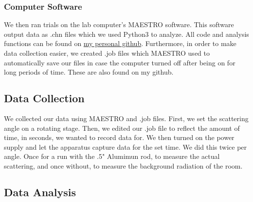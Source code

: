 \documentclass[10pt,letterpaper,onecolumn]{article}
\begin{document}
\subsubsection*{Computer Software}
We then ran trials on the lab computer's MAESTRO software. This software output data as .chn files which we used Python3 to analyze. All code and analysis functions can be found on \href{https://github.com/adeshpande03/seniorlab}{my personal github}. Furthermore, in order to make data collection easier, we created .job files which MAESTRO used to automatically save our files in case the computer turned off after being on for long periods of time. These are also found on my github.
\subsection{Data Collection}
We collected our data using MAESTRO and .job files. First, we set the scattering angle on a rotating stage. Then, we edited our .job file to reflect the amount of time, in seconds, we wanted to record data for. We then turned on the power supply and let the apparatus capture data for the set time. We did this twice per angle. Once for a run with the .5" Alumimun rod, to measure the actual scattering, and once without, to measure the background radiation of the room.
\subsection{Data Analysis}
 
 
\end{document}
